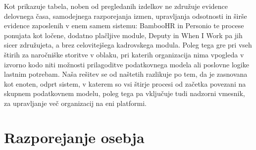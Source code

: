 \begin{table}[htbp]
\centering
\small
{}
\caption{Primerjava funkcionalnosti razvite rešitve z izbranimi komercialnimi rešitvami.}
\label{tab:komercialne-primerjava}
\end{table}

Kot prikazuje tabela, noben od pregledanih izdelkov ne združuje evidence delovnega časa, samodejnega razporejanja izmen, upravljanja odsotnosti in širše evidence zaposlenih v enem samem sistemu: BambooHR in Personio te procese ponujata kot ločene, dodatno plačljive module, Deputy in When I Work pa jih sicer združujeta, a brez celovitejšega kadrovskega modula. Poleg tega gre pri vseh štirih za naročniške storitve v oblaku, pri katerih organizacija nima vpogleda v izvorno kodo niti možnosti prilagoditve podatkovnega modela ali poslovne logike lastnim potrebam. Naša rešitev se od naštetih razlikuje po tem, da je zasnovana kot enoten, odprt sistem, v katerem so vsi štirje procesi od začetka povezani na skupnem podatkovnem modelu, poleg tega pa vključuje tudi nadzorni vmesnik, za upravljanje več organizacij na eni platformi.

\section{Razporejanje osebja}
\label{sec:razporejanje-osebja}

